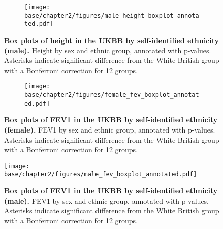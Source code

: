 \newpage

\begin{figure}[ht]
    \centering
    \begin{subfigure}{\textwidth}
    \texttt{[image: base/chapter2/figures/male\_height\_boxplot\_annotated.pdf]}
    \end{subfigure}
    \caption[Box plots of height in the UKBB by self-identified ethnicity (male)]{\textbf{Box plots of height in the UKBB by self-identified ethnicity (male).} Height by sex and ethnic group, annotated with p-values. Asterisks indicate significant difference from the White British group with a Bonferroni correction for 12 groups.}
    \label{fig:supp_box_height_m}
\end{figure}

\newpage

\begin{figure}[ht]
    \centering
    \begin{subfigure}{\textwidth}
    \texttt{[image: base/chapter2/figures/female\_fev\_boxplot\_annotated.pdf]}
    \end{subfigure}
    \caption[Box plots of FEV1 in the UKBB by self-identified ethnicity (female)]{\textbf{Box plots of FEV1 in the UKBB by self-identified ethnicity (female).} FEV1 by sex and ethnic group, annotated with p-values. Asterisks indicate significant difference from the White British group with a Bonferroni correction for 12 groups.}
    \label{fig:supp_box_fev_f}
\end{figure}

\newpage

\begin{figure}[ht]
    \centering
    \texttt{[image: base/chapter2/figures/male\_fev\_boxplot\_annotated.pdf]}
    \caption[Box plots of FEV1 in the UKBB by self-identified ethnicity (male)]{\textbf{Box plots of FEV1 in the UKBB by self-identified ethnicity (male).} FEV1 by sex and ethnic group, annotated with p-values. Asterisks indicate significant difference from the White British group with a Bonferroni correction for 12 groups.}
    \label{fig:supp_box_fev_m}
\end{figure}

\newpage

